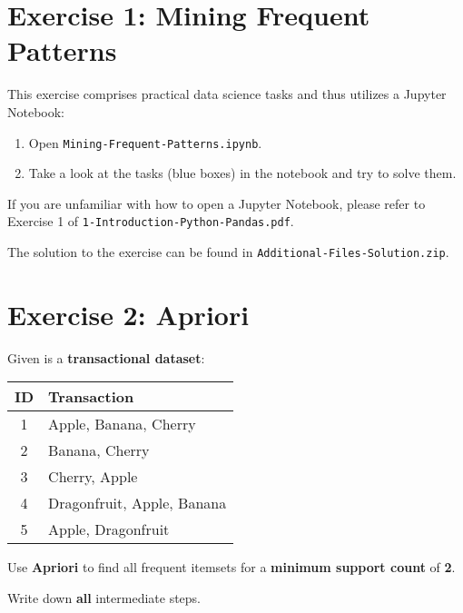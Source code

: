 \documentclass[
english,
smallborders
]{i6prcsht}
\begin{document}
\section*{Exercise 1: Mining Frequent Patterns}

This exercise comprises practical data science tasks and thus utilizes a Jupyter Notebook:

\begin{enumerate}
	\item Open \texttt{Mining-Frequent-Patterns.ipynb}.
	\item Take a look at the tasks (blue boxes) in the notebook and try to solve them.
\end{enumerate}

If you are unfamiliar with how to open a Jupyter Notebook, please refer to Exercise 1 of \texttt{1-Introduction-Python-Pandas.pdf}.

\begin{solution}
	The solution to the exercise can be found in \texttt{Additional-Files-Solution.zip}.
\end{solution}

\section*{Exercise 2: Apriori}

Given is a \textbf{transactional dataset}:

\begin{center}
	\begin{tabular}{|c|l|}
		\hline
		\textbf{ID} & \textbf{Transaction}       \\
		\hline
		1           & Apple, Banana, Cherry      \\
		\hline
		2           & Banana, Cherry             \\
		\hline
		3           & Cherry, Apple              \\
		\hline
		4           & Dragonfruit, Apple, Banana \\
		\hline
		5           & Apple, Dragonfruit         \\
		\hline
	\end{tabular}
\end{center}

Use \textbf{Apriori} to find all frequent itemsets for a \textbf{minimum support count} of \textbf{2}.

Write down \textbf{all} intermediate steps.
\end{document}

